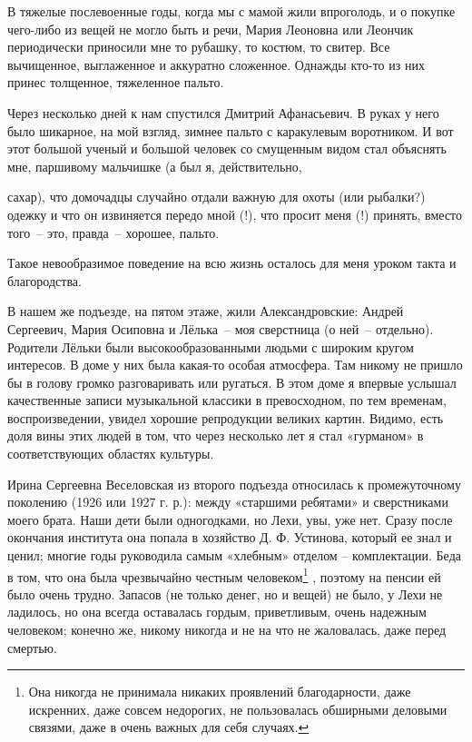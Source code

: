 В тяжелые послевоенные годы, когда мы с мамой жили впроголодь, и о покупке чего-либо из вещей не могло быть  и  речи,  Мария Леоновна или Леончик периодически приносили мне то рубашку, то костюм, то свитер. Все вычищенное, выглаженное и аккуратно сложенное. Однажды кто-то из них принес толщенное, тяжеленное пальто.

Через несколько дней к нам спустился Дмитрий Афанасьевич. В руках у него было шикарное, на мой взгляд, зимнее пальто с каракулевым воротником. И вот этот большой ученый и большой человек со смущенным видом стал объяснять мне, паршивому мальчишке (а был я, действительно, 




\restoregeometry

 сахар), что домочадцы случайно отдали важную для охоты (или рыбалки?) одежку и что он извиняется передо мной (!), что просит меня (!) принять, вместо того~-- это, правда~-- хорошее, пальто.



Такое невообразимое поведение на всю жизнь осталось для меня уроком такта и благородства.

В нашем же подъезде, на пятом этаже, жили Александровские: Андрей Сергеевич, Мария Осиповна и Лёлька~-- моя сверстница (о ней~-- отдельно). Родители Лёльки были высокообразованными людьми с широким кругом интересов. В доме у них была какая-то особая атмосфера. Там никому не пришло бы в голову громко разговаривать или ругаться. В этом доме я впервые услышал качественные записи музыкальной классики в превосходном, по тем временам, воспроизведении, увидел хорошие репродукции великих картин. Видимо, есть доля вины этих людей в том, что через несколько лет я стал «гурманом» в соответствующих областях культуры.

Ирина Сергеевна Веселовская из второго подъезда относилась к промежуточному поколению (1926 или 1927 г. р.): между «старшими ребятами» и сверстниками моего брата. Наши дети были одногодками, но Лехи, увы, уже нет. Сразу после окончания института она попала в хозяйство Д. Ф. Устинова, который ее знал и ценил; многие годы руководила самым «хлебным» отделом – комплектации. Беда в том, что она была чрезвычайно честным человеком\protect\footnote{Она никогда не принимала никаких проявлений благодарности, даже искренних, даже совсем недорогих, не пользовалась обширными деловыми связями, даже в очень важных для себя случаях.} , поэтому на пенсии ей было очень трудно. Запасов (не только денег, но и вещей) не было, у Лехи не ладилось, но она всегда оставалась гордым, приветливым, очень надежным человеком; конечно же, никому никогда и не на что не жаловалась, даже перед смертью. 

